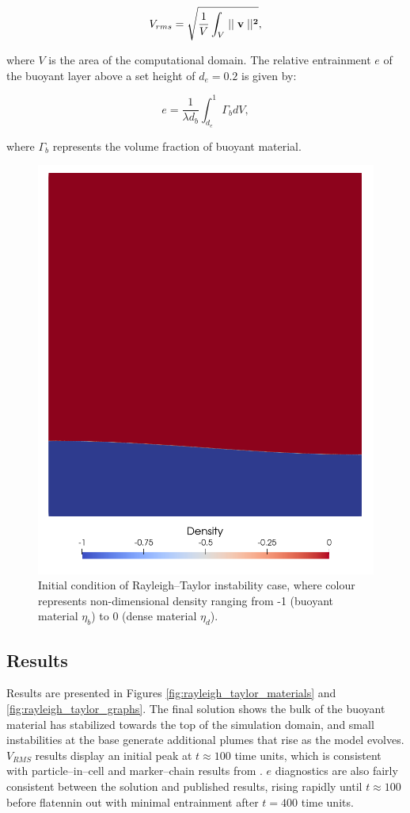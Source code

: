 \begin{equation}
    V_{rms} = \sqrt{\frac{1}{V}\int_V\mid\mid\bf{v}\mid\mid^{2}},
\end{equation}

\medskip \noindent where $V$ is the area of the computational domain. The relative entrainment  $e$ of the buoyant layer above a set height of $d_e = 0.2$ is given by:

\begin{equation}
    e = \frac{1}{\lambda d_b}\int_{d_e}^1\Gamma_b dV,
\end{equation}

\medskip \noindent where $\Gamma_b$ represents the volume fraction of buoyant material.

\begin{figure}[t]
	\centering
	      \includegraphics[width=0.60\columnwidth]{./examples_images/particle_rayleigh_taylor_mu10/Initial_condition.png}
   \caption{Initial condition of Rayleigh--Taylor instability case, where colour represents non-dimensional density ranging from -1 (buoyant material $\eta_{b}$) to 0 (dense material $\eta_{d}$).}
   \label{fig:rayleigh_taylor_initial_condition}
\end{figure}

\subsection{Results}

Results are presented in Figures \ref{fig:rayleigh_taylor_materials} and \ref{fig:rayleigh_taylor_graphs}. The final solution shows the bulk of the buoyant material has stabilized towards the top of the simulation domain, and small instabilities at the base generate additional plumes that rise as the model evolves. $V_{RMS}$ results display an initial peak at $t\approx 100$ time units, which is consistent with particle--in--cell and marker--chain results from \citet{vankeken1997comparison}. $e$ diagnostics are also fairly consistent between the solution and published results, rising rapidly until $t\approx 100$ before flatennin out with minimal entrainment after $t = 400$ time units.

